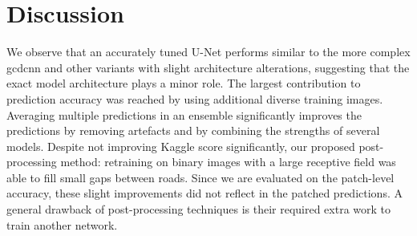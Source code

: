 
\section{Discussion} \label{section:discussion}

We observe that an accurately tuned U-Net performs similar to the more complex \acrshort{gcdcnn} and other variants with slight architecture alterations, suggesting that the exact model architecture plays a minor role. The largest contribution to prediction accuracy was reached by using additional diverse training images. Averaging multiple predictions in an ensemble significantly improves the predictions by removing artefacts and by combining the strengths of several models. Despite not improving Kaggle score significantly, our proposed post-processing method: retraining on binary images with a large receptive field was able to fill small gaps between roads. Since we are evaluated on the patch-level accuracy, these slight improvements did not reflect in the patched predictions. A general drawback of post-processing techniques is their required extra work to train another network.


